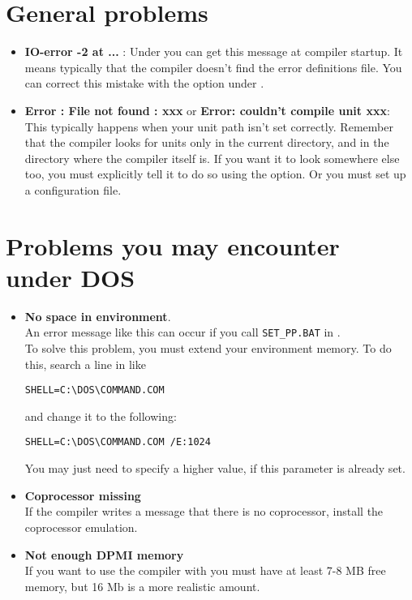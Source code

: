 \section{General problems}
\begin{itemize}
\item \textbf{IO-error -2 at ...} : Under \linux you can get this message at
compiler startup. It means typically that the compiler doesn't find the
error definitions file. You can correct this mistake with the 
option under \linux.
\item \textbf {Error : File not found : xxx} or \textbf{Error: couldn't compile
unit xxx}: This typically happens when
your unit path isn't set correctly. Remember that the compiler looks for
units only in the current directory, and in the directory where the compiler
itself is. If you want it to look somewhere else too, you must explicitly
tell it to do so using the  option. Or you must set up a
configuration file.
\end{itemize}

\section{Problems you may encounter under DOS}
\begin{itemize}
\item \textbf{No space in environment}.\\
An error message like this can occur if you call
\verb|SET_PP.BAT| in .\\
To solve this problem, you must extend your environment memory.
To do this, search a line in  like
\begin{verbatim}
SHELL=C:\DOS\COMMAND.COM
\end{verbatim}
and change it to the following:
\begin{verbatim}
SHELL=C:\DOS\COMMAND.COM /E:1024
\end{verbatim}
You may just need to specify a higher value, if this parameter is already set.
\item \textbf{ Coprocessor missing}\\
If the compiler writes
a message that there is no coprocessor, install
the coprocessor emulation.
\item \textbf{Not enough DPMI memory}\\
If you want to use the compiler with  you must have at least
7-8 MB free  memory, but 16 Mb is a more realistic amount.
\end{itemize}



